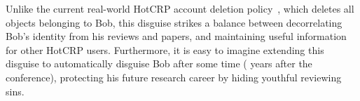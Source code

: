 %
Unlike the current real-world HotCRP account deletion policy~\cite{hotcrp:privacy}, which
deletes all objects belonging to Bob, this disguise strikes a balance between decorrelating
Bob's identity from his reviews and papers, and maintaining useful information for other
HotCRP users.
%
Furthermore, it is easy to imagine extending this disguise to automatically disguise Bob
after some time ( years after the conference), protecting his future research career
by hiding youthful reviewing sins.
